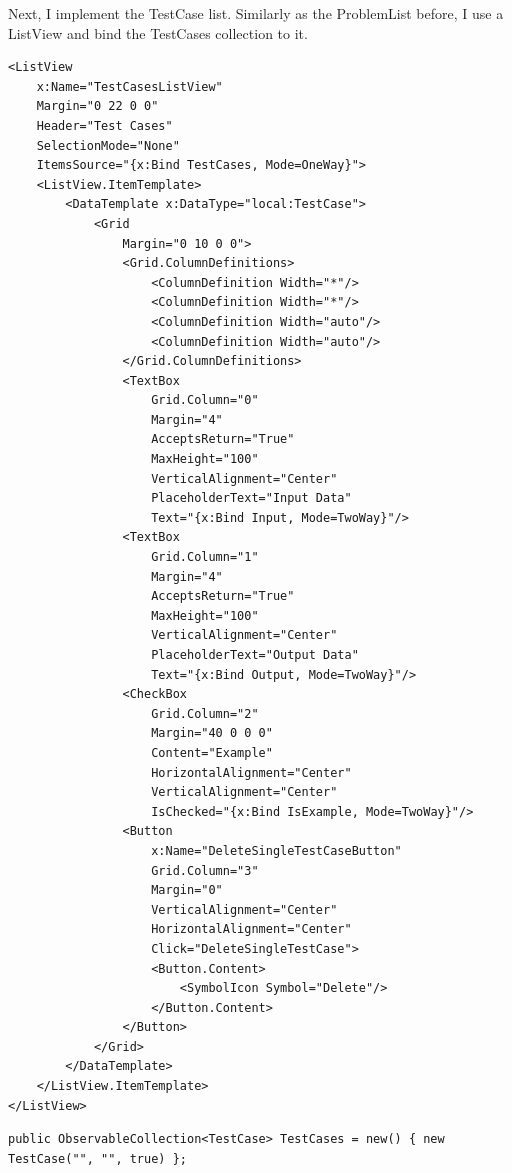 \documentclass[a4paper]{report}
\begin{document}
Next, I implement the TestCase list. Similarly as the ProblemList before, I use a ListView and bind the TestCases collection to it.

\begin{verbatim}
<ListView
    x:Name="TestCasesListView"
    Margin="0 22 0 0"
    Header="Test Cases"
    SelectionMode="None"
    ItemsSource="{x:Bind TestCases, Mode=OneWay}">
    <ListView.ItemTemplate>
        <DataTemplate x:DataType="local:TestCase">
            <Grid
                Margin="0 10 0 0">
                <Grid.ColumnDefinitions>
                    <ColumnDefinition Width="*"/>
                    <ColumnDefinition Width="*"/>
                    <ColumnDefinition Width="auto"/>
                    <ColumnDefinition Width="auto"/>
                </Grid.ColumnDefinitions>
                <TextBox
                    Grid.Column="0"
                    Margin="4"
                    AcceptsReturn="True"
                    MaxHeight="100"
                    VerticalAlignment="Center"
                    PlaceholderText="Input Data"
                    Text="{x:Bind Input, Mode=TwoWay}"/>
                <TextBox
                    Grid.Column="1"
                    Margin="4"
                    AcceptsReturn="True"
                    MaxHeight="100"
                    VerticalAlignment="Center"
                    PlaceholderText="Output Data"
                    Text="{x:Bind Output, Mode=TwoWay}"/>
                <CheckBox
                    Grid.Column="2"
                    Margin="40 0 0 0"
                    Content="Example"
                    HorizontalAlignment="Center"
                    VerticalAlignment="Center"
                    IsChecked="{x:Bind IsExample, Mode=TwoWay}"/>
                <Button
                    x:Name="DeleteSingleTestCaseButton"
                    Grid.Column="3"
                    Margin="0"
                    VerticalAlignment="Center"
                    HorizontalAlignment="Center"
                    Click="DeleteSingleTestCase">
                    <Button.Content>
                        <SymbolIcon Symbol="Delete"/>
                    </Button.Content>
                </Button>
            </Grid>
        </DataTemplate>
    </ListView.ItemTemplate>
</ListView>
\end{verbatim}

\begin{verbatim}
public ObservableCollection<TestCase> TestCases = new() { new TestCase("", "", true) };
\end{verbatim}
\end{document}
